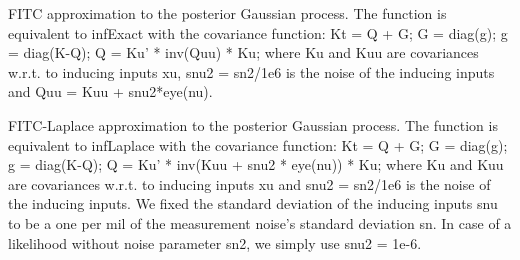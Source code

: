 \documentclass[letterpaper,10pt,english]{sphinxmanual}
\begin{document}

\begin{fulllineitems}
\label{Likelihoods:pyGPs.Core.inf.FITC_Exact}
FITC approximation to the posterior Gaussian process. The function is
equivalent to infExact with the covariance function:
Kt = Q + G; G = diag(g); g = diag(K-Q);  Q = Ku' * inv(Quu) * Ku; 
where Ku and Kuu are covariances w.r.t. to inducing inputs xu, snu2 = sn2/1e6
is the noise of the inducing inputs and Quu = Kuu + snu2*eye(nu).

\end{fulllineitems}


\begin{fulllineitems}
\label{Likelihoods:pyGPs.Core.inf.FITC_Laplace}
FITC-Laplace approximation to the posterior Gaussian process. The function is
equivalent to infLaplace with the covariance function:
Kt = Q + G; G = diag(g); g = diag(K-Q);  Q = Ku' * inv(Kuu + snu2 * eye(nu)) * Ku;
where Ku and Kuu are covariances w.r.t. to inducing inputs xu and
snu2 = sn2/1e6 is the noise of the inducing inputs. We fixed the standard
deviation of the inducing inputs snu to be a one per mil of the measurement 
noise's standard deviation sn. In case of a likelihood without noise
parameter sn2, we simply use snu2 = 1e-6.

\end{fulllineitems}

\end{document}
